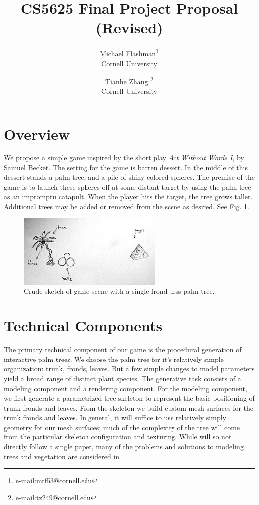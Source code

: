 \documentclass[annual]{acmsiggraph}
\title{CS5625 Final Project Proposal (Revised)}
\author{Michael Flashman\thanks{e-mail:mtf53@cornell.edu}\\Cornell University \and Tianhe Zhang \thanks{e-mail:tz249@cornell.edu}\\Cornell University}
\begin{document}
\maketitle


\section{Overview}
We propose a simple  game inspired by the short play \textit{Act Without Words I}, by Samuel Becket.   
The setting for the game is barren dessert.  In the middle of this dessert  stands a palm tree, and a pile of  shiny colored spheres.  The premise of the game is to launch these spheres off at some distant target by using the palm tree as an impromptu catapult.   When the player hits the target, the tree grows taller.  Additional trees may be added or removed from the scene as desired. See Fig. 1.

\begin{figure}[b]
\begin{center}
\includegraphics[height=100pt]{scene.png}
\caption{Crude sketch of game scene with a single frond--less palm tree.}
\label{default}
\end{center}
\end{figure}


\section{Technical Components}
The primary technical component of our game is the procedural generation of interactive palm trees.  We choose the palm tree for it's relatively simple organization: trunk, fronds, leaves.  But a few simple changes to model parameters yield a broad range of distinct plant species.  The generative task consists of a modeling component and a rendering component.  For the modeling component, we first generate a parametrized tree skeleton to represent the basic positioning of trunk fronds and leaves.  From the skeleton we  build custom mesh surfaces for the trunk fronds and leaves.  In general, it will suffice to use relatively simply geometry for our mesh surfaces;  much of the complexity of the tree will come from the particular skeleton configuration and texturing.   While will so not directly follow a single paper, many of the problems and solutions to modeling trees and vegetation are considered in \cite{bloomenthal1985}  \cite{kharlamov2008} \cite{sousa2008} 
\end{document}
